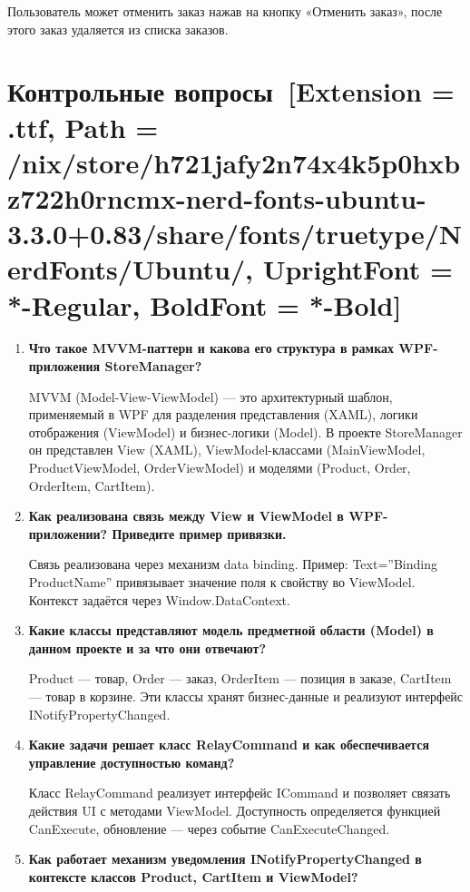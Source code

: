 \documentclass[12pt]{article}
\newcommand{\icon}[1]{\fontspec{UbuntuNerdFont}[Extension = .ttf,
  Path = /nix/store/h721jafy2n74x4k5p0hxbz722h0rncmx-nerd-fonts-ubuntu-3.3.0+0.83/share/fonts/truetype/NerdFonts/Ubuntu/,
  UprightFont = *-Regular,
BoldFont = *-Bold] #1}
\newcommand{\iicon}[1]{{\icon{#1}}}
\renewcommand{\texttt}[1]{{\small\ttfamily #1}}
\numberwithin{listing}{section}
\numberwithin{figure}{section}
\begin{document}
Пользователь может отменить заказ нажав на кнопку «Отменить заказ», после этого заказ удаляется из списка заказов.

\section{Контрольные вопросы~\texorpdfstring{\iicon{}}{}}
\begin{enumerate}
	\item \textbf{Что такое MVVM-паттерн и какова его структура в рамках WPF-приложения Store\-Manager?}

	      MVVM (Model-View-ViewModel) — это архитектурный шаблон, применяемый в WPF для разделения представления (XAML), логики отображения (ViewModel) и бизнес-логики (Model). В проекте StoreManager он представлен View (XAML), ViewModel-классами (\texttt{MainViewModel}, \texttt{ProductViewModel}, \texttt{OrderViewModel}) и моделями (\texttt{Product}, \texttt{Order}, \texttt{OrderItem}, \texttt{CartItem}).

	\item \textbf{Как реализована связь между View и ViewModel в WPF-приложении? Приведите пример привязки.}

	      Связь реализована через механизм data binding. Пример: \texttt{Text=''{Binding ProductName}''} привязывает значение поля к свойству во ViewModel. Контекст задаётся через \texttt{Window.DataContext}.

	\item \textbf{Какие классы представляют модель предметной области (Model) в данном проекте и за что они отвечают?}

	      \texttt{Product} — товар, \texttt{Order} — заказ, \texttt{OrderItem} — позиция в заказе, \texttt{CartItem} — товар в корзине. Эти классы хранят бизнес-данные и реализуют интерфейс \texttt{INotifyPropertyChanged}.

	\item \textbf{Какие задачи решает класс \texttt{RelayCommand} и как обеспечивается управление доступностью команд?}

	      Класс \texttt{RelayCommand} реализует интерфейс \texttt{ICommand} и позволяет связать действия UI с методами ViewModel. Доступность определяется функцией \texttt{CanExecute}, обновление — через событие \texttt{CanExecuteChanged}.

	\item \textbf{Как работает механизм уведомления \texttt{INotifyPropertyChanged} в контексте классов \texttt{Product}, \texttt{CartItem} и ViewModel?}


\end{enumerate}
\end{document}
